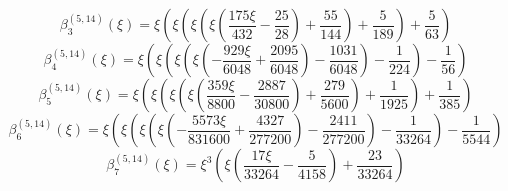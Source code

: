 \begin{equation}
\beta_{3}^{(5,14)} (\xi) =
 \xi \left(\xi \left(\xi \left(\xi \left(\frac{175 \xi}{432}
 - \frac{25}{28}\right) + \frac{55}{144}\right) + \frac{5}{189}\right) + \frac{5}{63}\right)
\end{equation}
\begin{equation}
\beta_{4}^{(5,14)} (\xi) =
 \xi \left(\xi \left(\xi \left(\xi \left(- \frac{929 \xi}{6048}
 + \frac{2095}{6048}\right) - \frac{1031}{6048}\right) - \frac{1}{224}\right) - \frac{1}{56}\right)
\end{equation}
\begin{equation}
\beta_{5}^{(5,14)} (\xi) =
 \xi \left(\xi \left(\xi \left(\xi \left(\frac{359 \xi}{8800}
 - \frac{2887}{30800}\right) + \frac{279}{5600}\right) + \frac{1}{1925}\right) + \frac{1}{385}\right)
\end{equation}
\begin{equation}
\beta_{6}^{(5,14)} (\xi) =
 \xi \left(\xi \left(\xi \left(\xi \left(- \frac{5573 \xi}{831600}
 + \frac{4327}{277200}\right) - \frac{2411}{277200}\right) - \frac{1}{33264}\right) - \frac{1}{5544}\right)
\end{equation}
\begin{equation}
\beta_{7}^{(5,14)} (\xi) =
 \xi^{3} \left(\xi \left(\frac{17 \xi}{33264} - \frac{5}{4158}\right) + \frac{23}{33264}\right)
\end{equation}
